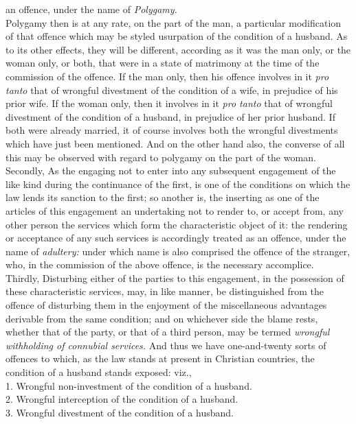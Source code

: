 \documentclass[12pt]{report}
\begin{document}
an offence, under the name of \emph{Polygamy.} \emph{\\
}Polygamy then is at any rate, on the part of the man, a particular
modification of that offence which may be styled usurpation of the
condition of a husband. As to its other effects, they will be different,
according as it was the man only, or the woman only, or both, that were
in a state of matrimony at the time of the commission of the offence. If
the man only, then his offence involves in it \emph{pro tanto} that of
wrongful divestment of the condition of a wife, in prejudice of his
prior wife. If the woman only, then it involves in it \emph{pro tanto}
that of wrongful divestment of the condition of a husband, in prejudice
of her prior husband. If both were already married, it of course
involves both the wrongful divestments which have just been mentioned.
And on the other hand also, the converse of all this may be observed
with regard to polygamy on the part of the woman.\\
Secondly, As the engaging not to enter into any subsequent engagement of
the like kind during the continuance of the first, is one of the
conditions on which the law lends its sanction to the first; so another
is, the inserting as one of the articles of this engagement an
undertaking not to render to, or accept from, any other person the
services which form the characteristic object of it: the rendering or
acceptance of any such services is accordingly treated as an offence,
under the name of \emph{adultery:} under which name is also comprised
the offence of the stranger, who, in the commission of the above
offence, is the necessary accomplice.\\
Thirdly, Disturbing either of the parties to this engagement, in the
possession of these characteristic services, may, in like manner, be
distinguished from the offence of disturbing them in the enjoyment of
the miscellaneous advantages derivable from the same condition; and on
whichever side the blame rests, whether that of the party, or that of a
third person, may be termed \emph{wrongful withholding of connubial
services.} And thus we have one-and-twenty sorts of offences to which,
as the law stands at present in Christian countries, the condition of a
husband stands exposed: viz.,\\
1. Wrongful non-investment of the condition of a husband.\\
2. Wrongful interception of the condition of a husband.\\
3. Wrongful divestment of the condition of a husband.\\
\end{document}
